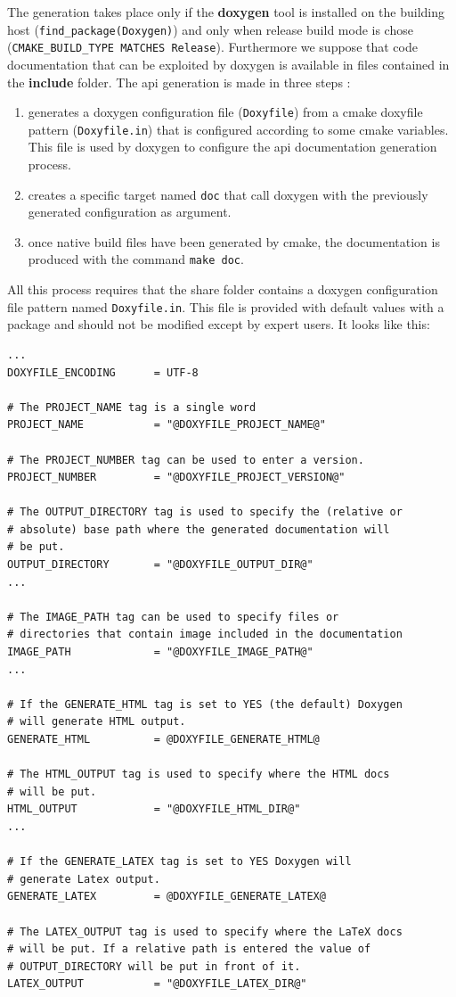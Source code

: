 \documentclass[12pt,a4paper]{article}
\begin{document}
The generation takes place only if the \textbf{doxygen} tool is installed on the building host (\verb|find_package(Doxygen)|) and only when release build mode is chose (\verb|CMAKE_BUILD_TYPE MATCHES Release|). Furthermore we suppose that code documentation that can be exploited by doxygen is available in files contained in the \textbf{include} folder. The api generation is made in three steps :
\begin{enumerate}
\item generates a doxygen configuration file (\texttt{Doxyfile}) from a cmake doxyfile pattern (\texttt{Doxyfile.in}) that is configured according to some cmake variables. This file is used by doxygen to configure the api documentation generation process.
\item creates a specific target named \texttt{doc} that call doxygen with the previously generated configuration as argument.
\item once native build files have been generated by cmake, the documentation is produced with the command \texttt{make doc}.
\end{enumerate}
All this process requires that the share folder contains a doxygen configuration file pattern named \texttt{Doxyfile.in}. This file is provided with default values with a package and should not be modified except by expert users. It looks like this:
\begin{verbatim}
...
DOXYFILE_ENCODING      = UTF-8

# The PROJECT_NAME tag is a single word 
PROJECT_NAME           = "@DOXYFILE_PROJECT_NAME@"

# The PROJECT_NUMBER tag can be used to enter a version. 
PROJECT_NUMBER         = "@DOXYFILE_PROJECT_VERSION@"

# The OUTPUT_DIRECTORY tag is used to specify the (relative or 
# absolute) base path where the generated documentation will 
# be put. 
OUTPUT_DIRECTORY       = "@DOXYFILE_OUTPUT_DIR@"
...

# The IMAGE_PATH tag can be used to specify files or 
# directories that contain image included in the documentation
IMAGE_PATH             = "@DOXYFILE_IMAGE_PATH@"
...

# If the GENERATE_HTML tag is set to YES (the default) Doxygen 
# will generate HTML output.
GENERATE_HTML          = @DOXYFILE_GENERATE_HTML@

# The HTML_OUTPUT tag is used to specify where the HTML docs 
# will be put. 
HTML_OUTPUT            = "@DOXYFILE_HTML_DIR@"
...

# If the GENERATE_LATEX tag is set to YES Doxygen will 
# generate Latex output.
GENERATE_LATEX         = @DOXYFILE_GENERATE_LATEX@

# The LATEX_OUTPUT tag is used to specify where the LaTeX docs 
# will be put. If a relative path is entered the value of 
# OUTPUT_DIRECTORY will be put in front of it. 
LATEX_OUTPUT           = "@DOXYFILE_LATEX_DIR@"

\end{verbatim}
\end{document}
